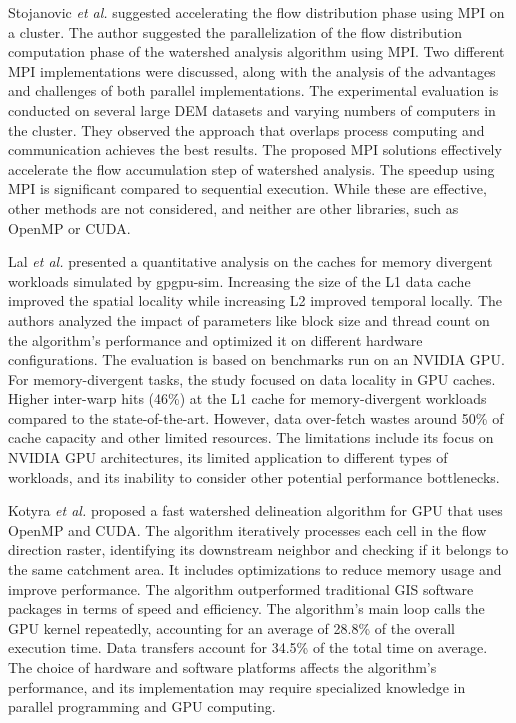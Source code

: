 \documentclass[journal, a4paper]{IEEEtran}
\begin{document}
	Stojanovic \textit{et al.} \cite{stojanovic2020accelerating} suggested accelerating the flow distribution phase using MPI on a cluster. The author suggested the parallelization of the flow distribution computation phase of the watershed analysis algorithm using MPI. Two different MPI implementations were discussed, along with the analysis of the advantages and challenges of both parallel implementations. The experimental evaluation is conducted on several large DEM datasets and varying numbers of computers in the cluster. They observed the approach that overlaps process computing and communication achieves the best results. The proposed MPI solutions effectively accelerate the flow accumulation step of watershed analysis. The speedup using MPI is significant compared to sequential execution. While these are effective, other methods are not considered, and neither are other libraries, such as OpenMP or CUDA.
	
	Lal \textit{et al.} \cite{10.1007/978-3-030-60939-9_16} presented a quantitative analysis on the caches for memory divergent workloads simulated by gpgpu-sim. Increasing the size of the L1 data cache improved the spatial locality while increasing L2 improved temporal locally. The authors analyzed the impact of parameters like block size and thread count on the algorithm's performance and optimized it on different hardware configurations. The evaluation is based on benchmarks run on an NVIDIA GPU. For memory-divergent tasks, the study focused on data locality in GPU caches. Higher inter-warp hits (46\%) at the L1 cache for memory-divergent workloads compared to the state-of-the-art. However, data over-fetch wastes around 50\% of cache capacity and other limited resources. The limitations include its focus on NVIDIA GPU architectures, its limited application to different types of workloads, and its inability to consider other potential performance bottlenecks.
	
	Kotyra \textit{et al.} \cite{KOTYRA2023105613} proposed a fast watershed delineation algorithm for GPU that uses OpenMP and CUDA. The algorithm iteratively processes each cell in the flow direction raster, identifying its downstream neighbor and checking if it belongs to the same catchment area. It includes optimizations to reduce memory usage and improve performance. The algorithm outperformed traditional GIS software packages in terms of speed and efficiency. The algorithm's main loop calls the GPU kernel repeatedly, accounting for an average of 28.8\% of the overall execution time. Data transfers account for 34.5\% of the total time on average. The choice of hardware and software platforms affects the algorithm's performance, and its implementation may require specialized knowledge in parallel programming and GPU computing.
	
\end{document}
